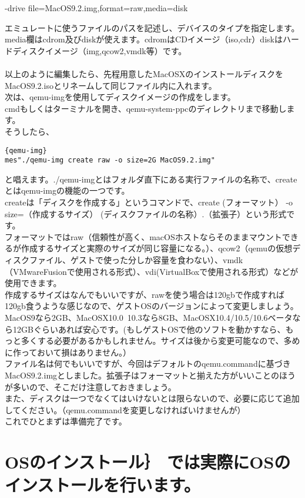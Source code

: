 \documentclass[b5paper,10pt]{jsarticle}
\begin{document}
\begin{multicols*}{3}
\begin{lstlistng}[saitama]
\begin{itembox}
 -drive file=MacOS9.2.img,format=raw,media=disk 
\end{itembox}
エミュレートに使うファイルのパスを記述し、デバイスのタイプを指定します。\\
media欄はcdrom及びdiskが使えます。cdromはCDイメージ（iso,cdr）diskはハードディスクイメージ（img,qcow2,vmdk等）です。\\
\\
以上のように編集したら、先程用意したMacOSXのインストールディスクをMacOS9.2.isoとリネームして同じファイル内に入れます。\\
次は、qemu-imgを使用してディスクイメージの作成をします。\\
cmdもしくはターミナルを開き、qemu-system-ppcのディレクトリまで移動します。\\
そうしたら、
\begin{lstlisting}{qemu-img}
mes"./qemu-img create raw -o size=2G MacOS9.2.img"
\end{lstlisting}
と唱えます。./qemu-imgとはフォルダ直下にある実行ファイルの名称で、createとはqemu-imgの機能の一つです。\\
createは「ディスクを作成する」というコマンドで、create (フォーマット） -o size=（作成するサイズ） (ディスクファイルの名称）.（拡張子）という形式です。\\
フォーマットではraw（信頼性が高く、macOSホストならそのままマウントできるが作成するサイズと実際のサイズが同じ容量になる。）、qcow2（qemuの仮想ディスクファイル、ゲストで使った分しか容量を食わない）、vmdk（VMwareFusionで使用される形式）、vdi(VirtualBoxで使用される形式）などが使用できます。\\
作成するサイズはなんでもいいですが、rawを使う場合は120gbで作成すれば120gb食うような感じなので、ゲストOSのバージョンによって変更しましょう。\\
MacOS9なら2GB、MacOSX10.0~10.3なら8GB、MacOSX10.4/10.5/10.6ベータなら12GBぐらいあれば安心です。(もしゲストOSで他のソフトを動かすなら、もっと多くする必要があるかもしれません。サイズは後から変更可能なので、多めに作っておいて損はありません。）\\
ファイル名は何でもいいですが、今回はデフォルトのqemu.commandに基づきMacOS9.2.imgとしました。拡張子はフォーマットと揃えた方がいいことのほうが多いので、そこだけ注意しておきましょう。\\
また、ディスクは一つでなくてはいけないとは限らないので、必要に応じて追加してください。（qemu.commandを変更しなければいけませんが）\\
これでひとまずは準備完了です。\\
\section{OSのインストール｝
では実際にOSのインストールを行います。\\
}
\end{lstlistng}
\end{multicols*}
\end{document}
